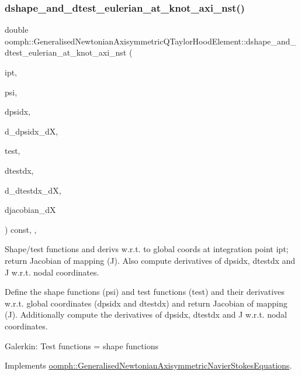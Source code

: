 \subsubsection{\texorpdfstring{dshape\+\_\+and\+\_\+dtest\+\_\+eulerian\+\_\+at\+\_\+knot\+\_\+axi\+\_\+nst()}{dshape\_and\_dtest\_eulerian\_at\_knot\_axi\_nst()}\hspace{0.1cm}{\footnotesize\ttfamily [2/2]}}
{\footnotesize\ttfamily double oomph\+::\+Generalised\+Newtonian\+Axisymmetric\+Q\+Taylor\+Hood\+Element\+::dshape\+\_\+and\+\_\+dtest\+\_\+eulerian\+\_\+at\+\_\+knot\+\_\+axi\+\_\+nst (\begin{DoxyParamCaption}\item[{const unsigned \&}]{ipt,  }\item[{\hyperlink{classoomph_1_1Shape}{Shape} \&}]{psi,  }\item[{\hyperlink{classoomph_1_1DShape}{D\+Shape} \&}]{dpsidx,  }\item[{\hyperlink{classoomph_1_1RankFourTensor}{Rank\+Four\+Tensor}$<$ double $>$ \&}]{d\+\_\+dpsidx\+\_\+dX,  }\item[{\hyperlink{classoomph_1_1Shape}{Shape} \&}]{test,  }\item[{\hyperlink{classoomph_1_1DShape}{D\+Shape} \&}]{dtestdx,  }\item[{\hyperlink{classoomph_1_1RankFourTensor}{Rank\+Four\+Tensor}$<$ double $>$ \&}]{d\+\_\+dtestdx\+\_\+dX,  }\item[{\hyperlink{classoomph_1_1DenseMatrix}{Dense\+Matrix}$<$ double $>$ \&}]{djacobian\+\_\+dX }\end{DoxyParamCaption}) const\hspace{0.3cm}{\ttfamily [inline]}, {\ttfamily [protected]}, {\ttfamily [virtual]}}



Shape/test functions and derivs w.\+r.\+t. to global coords at integration point ipt; return Jacobian of mapping (J). Also compute derivatives of dpsidx, dtestdx and J w.\+r.\+t. nodal coordinates. 

Define the shape functions (psi) and test functions (test) and their derivatives w.\+r.\+t. global coordinates (dpsidx and dtestdx) and return Jacobian of mapping (J). Additionally compute the derivatives of dpsidx, dtestdx and J w.\+r.\+t. nodal coordinates.

Galerkin\+: Test functions = shape functions 

Implements \hyperlink{classoomph_1_1GeneralisedNewtonianAxisymmetricNavierStokesEquations_a768856dbac816acd9b207ed6065bcae7}{oomph\+::\+Generalised\+Newtonian\+Axisymmetric\+Navier\+Stokes\+Equations}.




